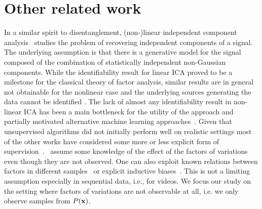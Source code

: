 \documentclass{article}
\renewcommand{\P}{P}
\begin{document}
\section{Other related work}\label{sec:other_rel_work}
In a similar spirit to disentanglement, (non-)linear independent component analysis~\citep{comon1994independent,bach2002kernel,jutten2003advances, hyvarinen2016unsupervised} studies the problem of recovering independent components of a signal. The underlying assumption is that there is a generative model for the signal composed of the combination of statistically independent non-Gaussian components. While the
identifiability result for linear ICA \citep{comon1994independent} proved to be a milestone for the classical theory of factor analysis, similar results are in general not obtainable for the nonlinear case and the underlying sources generating the data cannot be identified
 \citep{hyvarinen1999nonlinear}. The lack of almost any identifiability result in non-linear ICA has been a main bottleneck for the utility of the approach \citep{hyvarinen2018nonlinear} and partially motivated alternative machine learning approaches~\citep{desjardins2012disentangling,schmidhuber1992learning,cohen2014transformation}.
Given that unsupervised algorithms did not initially perform well on realistic settings most of the other works have considered some more or less explicit form of supervision~\citep{reed2014learning,zhu2014multi,yang2015weakly,kulkarni2015deep,cheung2014discovering,mathieu2016disentangling,narayanaswamy2017learning,suter2018interventional}.~\citep{hinton2011transforming,cohen2014learning} assume some knowledge of the effect of the factors of variations even though they are not observed. One can also exploit known relations between factors in different samples~\citep{karaletsos2015bayesian,goroshin2015learning,whitney2016understanding,fraccaro2017disentangled,denton2017unsupervised,hsu2017unsupervised,yingzhen2018disentangled} or explicit inductive biases~\citep{locatello2018clustering}. This is not a limiting assumption especially in sequential data, i.e., for videos.
We focus our study on the setting where factors of variations are not observable at all, i.e. we only observe samples from $\P(\rvx)$. 
\end{document}
